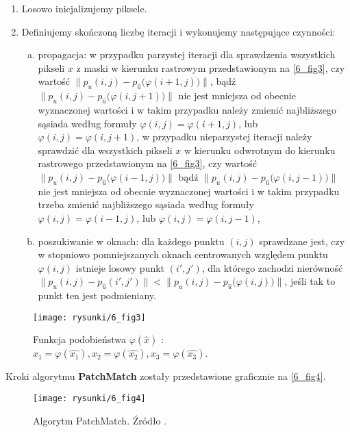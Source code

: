 \documentclass[12pt, twoside, openany]{report}
\theoremstyle{definition}
\begin{document}
\begin{enumerate}
\item
Losowo inicjalizujemy piksele.
\item
Definiujemy skończoną liczbę iteracji i wykonujemy następujące czynności:
\begin{enumerate}[a)]
\item
propagacja: w przypadku parzystej iteracji dla sprawdzenia wszystkich pikseli $x$ z maski w kierunku rastrowym przedstawionym na \autoref{6_fig3}, czy 
wartość $\big\| p_u(i,j) - p_{\hat{u}}\big(\varphi(i+1,j)\big) \big\|$, bądź $\big\| p_{u}(i,j) - p_{\hat{u}}\big(\varphi(i,j+1)\big) \big\|$ nie jest mniejsza od obecnie wyznaczonej wartości i w takim przypadku należy zmienić najbliższego sąsiada według formuły $\varphi(i,j) = \varphi(i+1,j)$, lub $\varphi(i,j) = \varphi(i,j+1)$, 
w przypadku nieparzystej iteracji należy sprawdzić dla wszystkich pikseli $x$ w kierunku odwrotnym do kierunku rastrowego przedstawionym na \autoref{6_fig3}, czy 
wartość $\big\| p_{u}(i,j) - p_{\hat{u}}\big(\varphi(i-1,j)\big) \big\|$ bądź $\big\| p_{u}(i,j) - p_{\hat{u}}\big(\varphi(i,j-1)\big) \big\|$ nie jest mniejsza od obecnie wyznaczonej wartości i w takim przypadku trzeba zmienić najbliższego sąsiada według formuły $\varphi(i,j) = \varphi(i-1,j)$, lub $\varphi(i,j) = \varphi(i,j-1)$,
\item
poszukiwanie w oknach: dla każdego punktu $(i,j)$ sprawdzane jest, czy w stopniowo pomniejszanych oknach centrowanych względem punktu $\varphi(i,j)$ istnieje losowy punkt $(i', j')$, dla którego zachodzi nierówność $\big\| p_{u}(i,j) - p_{\hat{u}}(i',j') \big\| < \big\| p_{u}(i,j) - p_{\hat{u}}\big(\varphi(i,j) \big)\big\|$, jeśli tak to punkt ten jest podmieniany.
\end{enumerate}
\end{enumerate}
\begin{figure}[!h]
	\centering
	\texttt{[image: rysunki/6\_fig3]}
	\caption{Funkcja podobieństwa $\varphi(\hat{x})$ : $x_1 = \varphi(\hat{x_1}), x_2 = \varphi(\hat{x_2}), x_3 = \varphi(\hat{x_3})$.}
	\label{6_fig3}
\end{figure}
Kroki algorytmu \textbf{PatchMatch} zostały przedstawione graficznie na \autoref{6_fig4}.
\begin{figure}[!h]
	\centering
	\texttt{[image: rysunki/6\_fig4]}
	\caption{Algorytm PatchMatch. Źródło \cite{arias2011variational}.}
	\label{6_fig4}
\end{figure}
\end{document}
